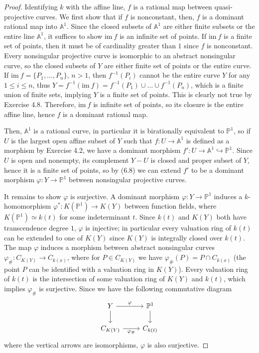 \documentclass[12pt]{article}
\newcommand{\Img}[1]{\text{im}~#1}
\newcommand{\A}{\mathbb{A}}
\newcommand{\PP}{\mathbb{P}}
\theoremstyle{definition}
\begin{document}
\begin{enumerate} [label=\textbf{\arabic*.}, leftmargin=-0.05em]
\begin{proof}
  Identifying $k$ with the affine line, $f$ is a rational map between quasi-projective curves. We first show that if $f$ is nonconstant, then, $f$ is a dominant rational map into $\A^1$. Since the closed subsets of $\A^1$ are either finite subsets or the entire line $\A^1$, it suffices to show $\Img{f}$ is an infinite set of points. If $\Img{f}$ is a finite set of points, then it must be of cardinality greater than $1$ since $f$ is nonconstant. Every nonsingular projective curve is isomorphic to an abstract nonsingular curve, so the closed subsets of $Y$ are either finite set of points or the entire curve. If $\Img{f} = \{ P_1, \dots, P_n \}$, $n > 1$, then $f^{-1}(P_i)$ cannot be the entire curve $Y$ for any $1 \leq i \leq n$, thus $Y = f^{-1}(\Img{f}) = f^{-1}(P_1) \cup \dots \cup f^{-1}(P_n)$, which is a finite union of finite sets, implying $Y$ is a finite set of points. This is clearly not true by Exercise 4.8. Therefore, $\Img{f}$ is infinite set of points, so its closure is the entire affine line, hence $f$ is a dominant rational map.

  Then, $\A^1$ is a rational curve, in particular it is birationally equivalent to $\PP^1$, so if $U$ is the largest open affine subset of $Y$ such that $f : U \to \A^1$ is defined as a morphism by Exercise 4.2, we have a dominant morphism $f' : U \to \A^1 \hookrightarrow \PP^1$. Since $U$ is open and nonempty, its complement $Y - U$ is closed and proper subset of $Y$, hence it is a finite set of points, so by (6.8) we can extend $f'$ to be a dominant morphism $\varphi: Y \to \PP^1$ between nonsingular projective curves. 
  
  It remains to show $\varphi$ is surjective. A dominant morphism $\varphi : Y \to \PP^1$ induces a $k$-homomorphism $\varphi^* : K(\PP^1) \to K(Y)$ between function fields, where $K(\PP^1) \simeq k(t)$ for some indeterminant $t$. Since $k(t)$ and $K(Y)$ both have transcendence degree $1$, $\varphi$ is injective; in particular every valuation ring of $k(t)$ can be extended to one of $K(Y)$ since $K(Y)$ is integrally closed over $k(t)$. The map $\varphi$ induces a morphism between abstract nonsingular curves $\varphi_\# : C_{K(Y)} \to C_{k(x)}$, where for $P \in C_{K(Y)}$ we have $\varphi_\# (P) = P \cap C_{k(x)}$ (the point $P$ can be identified with a valuation ring in $K(Y)$). Every valuation ring of $k(t)$ is the intersection of some valuation ring of $K(Y)$ and $k(t)$, which implies $\varphi_\#$ is surjective. Since we have the following commutative diagram
  \[ \begin{tikzcd}
    Y \arrow[d] \arrow[r, "\varphi"]  & \PP^1 \arrow[d] \\
    C_{K(Y)} \arrow[r, "\varphi_\#"'] & C_{k(t)}       
    \end{tikzcd} \]
  where the vertical arrows are isomorphisms, $\varphi$ is also surjective.


\end{proof}
\end{enumerate}
\end{document}
